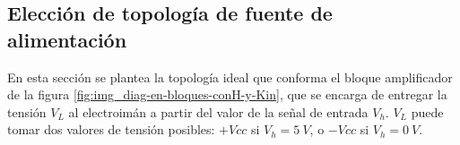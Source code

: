 




\subsection{Elección de topología de fuente de alimentación}\label{sec_topologia-fuente-alimentacion}

%
%

En esta sección se plantea la topología ideal que conforma el bloque amplificador de la figura \ref{fig:img_diag-en-bloques-conH-y-Kin}, que se encarga de entregar la tensión $V_L$ al electroimán a partir del valor de la señal de entrada $V_h$. $V_L$ puede tomar dos valores de tensión posibles: $+Vcc$ si $V_h=5\:V$, o $-Vcc$ si $V_h=0\:V$.

